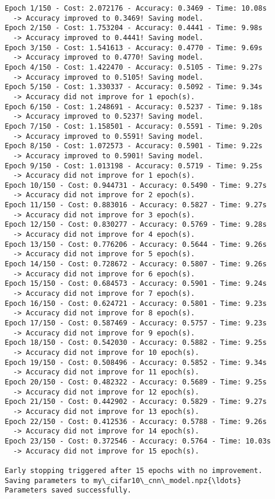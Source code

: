 \documentclass[11pt]{article}
\begin{document}
    \begin{Verbatim}[commandchars=\\\{\}]
Epoch 1/150 - Cost: 2.072176 - Accuracy: 0.3469 - Time: 10.08s
  -> Accuracy improved to 0.3469! Saving model.
Epoch 2/150 - Cost: 1.753204 - Accuracy: 0.4441 - Time: 9.98s
  -> Accuracy improved to 0.4441! Saving model.
Epoch 3/150 - Cost: 1.541613 - Accuracy: 0.4770 - Time: 9.69s
  -> Accuracy improved to 0.4770! Saving model.
Epoch 4/150 - Cost: 1.422470 - Accuracy: 0.5105 - Time: 9.27s
  -> Accuracy improved to 0.5105! Saving model.
Epoch 5/150 - Cost: 1.330337 - Accuracy: 0.5092 - Time: 9.34s
  -> Accuracy did not improve for 1 epoch(s).
Epoch 6/150 - Cost: 1.248691 - Accuracy: 0.5237 - Time: 9.18s
  -> Accuracy improved to 0.5237! Saving model.
Epoch 7/150 - Cost: 1.158501 - Accuracy: 0.5591 - Time: 9.20s
  -> Accuracy improved to 0.5591! Saving model.
Epoch 8/150 - Cost: 1.072573 - Accuracy: 0.5901 - Time: 9.22s
  -> Accuracy improved to 0.5901! Saving model.
Epoch 9/150 - Cost: 1.013198 - Accuracy: 0.5719 - Time: 9.25s
  -> Accuracy did not improve for 1 epoch(s).
Epoch 10/150 - Cost: 0.944731 - Accuracy: 0.5490 - Time: 9.27s
  -> Accuracy did not improve for 2 epoch(s).
Epoch 11/150 - Cost: 0.883016 - Accuracy: 0.5827 - Time: 9.27s
  -> Accuracy did not improve for 3 epoch(s).
Epoch 12/150 - Cost: 0.830277 - Accuracy: 0.5769 - Time: 9.28s
  -> Accuracy did not improve for 4 epoch(s).
Epoch 13/150 - Cost: 0.776206 - Accuracy: 0.5644 - Time: 9.26s
  -> Accuracy did not improve for 5 epoch(s).
Epoch 14/150 - Cost: 0.728672 - Accuracy: 0.5807 - Time: 9.26s
  -> Accuracy did not improve for 6 epoch(s).
Epoch 15/150 - Cost: 0.684573 - Accuracy: 0.5901 - Time: 9.24s
  -> Accuracy did not improve for 7 epoch(s).
Epoch 16/150 - Cost: 0.624721 - Accuracy: 0.5801 - Time: 9.23s
  -> Accuracy did not improve for 8 epoch(s).
Epoch 17/150 - Cost: 0.587469 - Accuracy: 0.5757 - Time: 9.23s
  -> Accuracy did not improve for 9 epoch(s).
Epoch 18/150 - Cost: 0.542030 - Accuracy: 0.5882 - Time: 9.25s
  -> Accuracy did not improve for 10 epoch(s).
Epoch 19/150 - Cost: 0.508496 - Accuracy: 0.5852 - Time: 9.34s
  -> Accuracy did not improve for 11 epoch(s).
Epoch 20/150 - Cost: 0.482322 - Accuracy: 0.5689 - Time: 9.25s
  -> Accuracy did not improve for 12 epoch(s).
Epoch 21/150 - Cost: 0.442902 - Accuracy: 0.5829 - Time: 9.27s
  -> Accuracy did not improve for 13 epoch(s).
Epoch 22/150 - Cost: 0.412536 - Accuracy: 0.5788 - Time: 9.26s
  -> Accuracy did not improve for 14 epoch(s).
Epoch 23/150 - Cost: 0.372546 - Accuracy: 0.5764 - Time: 10.03s
  -> Accuracy did not improve for 15 epoch(s).

Early stopping triggered after 15 epochs with no improvement.
Saving parameters to my\_cifar10\_cnn\_model.npz{\ldots}
Parameters saved successfully.
    \end{Verbatim}
\end{document}
